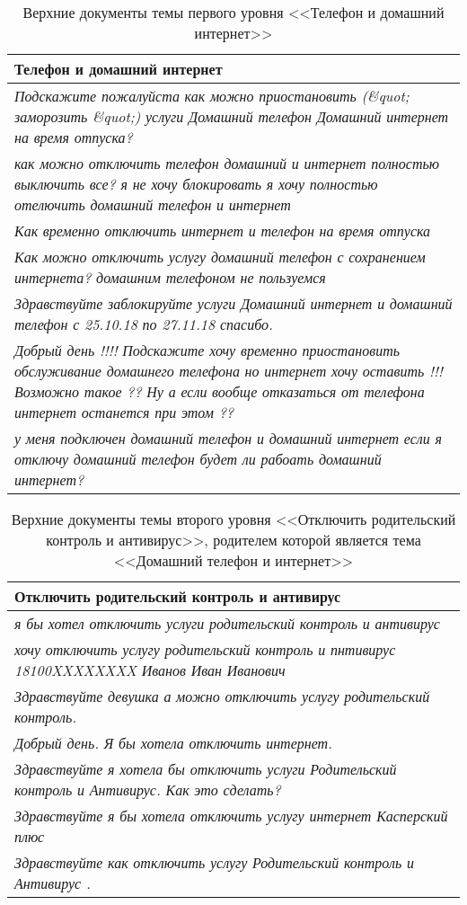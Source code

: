 \begin{table}[!h]
\begin{tabular}{p{7cm}}
  \hline
  \textbf{Телефон и домашний интернет} \\
  \hline
  \textsl{Подскажите пожалуйста как можно приостановить (\&quot; заморозить \&quot;) услуги Домашний телефон Домашний интернет на время отпуска?} \\
  \textsl{как можно отключить телефон домашний и интернет полностью выключить все? 
я не хочу блокировать я хочу полностью отелючить домашний телефон и интернет} \\
  \textsl{Как временно отключить интернет и телефон на время отпуска} \\
  \textsl{Как можно отключить услугу домашний телефон с сохранением интернета? домашним телефоном не пользуемся} \\
  \textsl{Здравствуйте заблокируйте услуги Домашний интернет и домашний телефон с 25.10.18 по 27.11.18 спасибо.} \\
  \textsl{Добрый день !!!! Подскажите хочу временно приостановить обслуживание домашнего телефона но интернет хочу оставить !!! Возможно такое ??  Ну а если вообще отказаться от телефона интернет останется при этом ??} \\
  \textsl{у меня подключен домашний телефон и домашний интернет если я отключу домашний телефон будет ли рабоать домашний интернет?} \\
  \hline
\end{tabular}
\caption{Верхние документы темы первого уровня <<Телефон и домашний интернет>>}
\label{topic_documents}
\end{table}

\begin{table}[!h]
\begin{tabular}{p{7cm}}
  \hline
  \textbf{Отключить родительский контроль и антивирус} \\
  \hline
  \textsl{я бы хотел отключить услуги родительский контроль и антивирус} \\
  \textsl{хочу отключить услугу родительский контроль и пнтивирус
18100XXXXXXXX Иванов Иван Иванович} \\
  \textsl{Здравствуйте девушка а можно отключить услугу родительский контроль.} \\
  \textsl{Добрый день. Я бы хотела отключить интернет.} \\
  \textsl{Здравствуйте я хотела бы отключить услуги Родительский контроль и Антивирус. Как это сделать?} \\
  \textsl{Здравствуйте я бы хотела отключить услугу интернет Касперский плюс} \\
  \textsl{Здравствуйте как отключить услугу Родительский контроль и Антивирус .} \\
  \hline
\end{tabular}
\caption{Верхние документы темы второго уровня <<Отключить родительский контроль и антивирус>>, родителем которой является тема <<Домашний телефон и интернет>>}
\label{subtopic_documents}
\end{table}

